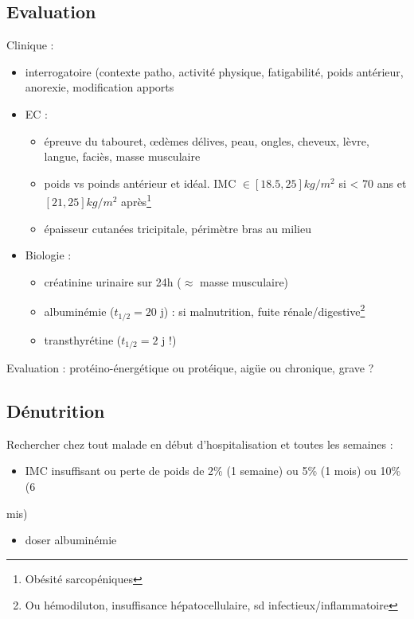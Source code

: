 \documentclass[11pt]{article}
\begin{document}
\subsection{Evaluation}
\label{sec:org3b25a70}
Clinique : 
\begin{itemize}
\item interrogatoire (contexte patho, activité physique, fatigabilité, poids
antérieur, anorexie, modification apports
\item EC : 
\begin{itemize}
\item épreuve du tabouret, \oe{}dèmes délives, peau, ongles, cheveux, lèvre,
langue, faciès, masse musculaire
\item poids vs poinds antérieur et idéal. IMC \(\in [18.5, 25] kg/m^2\) si < 70 ans
et \([21, 25] kg/m^2\) après\footnote{\danger Obésité sarcopéniques}
\item épaisseur cutanées tricipitale, périmètre bras au milieu
\end{itemize}
\item Biologie : 
\begin{itemize}
\item créatinine urinaire sur 24h (\(\approx\) masse musculaire)
\item albuminémie (\(t_{1/2} = 20\) j) : \dec si malnutrition, fuite rénale/digestive\footnote{Ou hémodiluton, insuffisance hépatocellulaire, sd infectieux/inflammatoire}
\item transthyrétine (\(t_{1/2} = 2\) j !)
\end{itemize}
\end{itemize}
Evaluation : protéino-énergétique ou protéique, aigüe ou chronique, grave ?

\subsection{Dénutrition}
\label{sec:org78e4931}
Rechercher chez tout malade en début d'hospitalisation et toutes les semaines :
\begin{itemize}
\item IMC insuffisant ou perte de poids de 2\% (1 semaine) ou 5\% (1 mois) ou 10\% (6
\end{itemize}
mis)
\begin{itemize}
\item doser albuminémie
\end{itemize}
\end{document}
